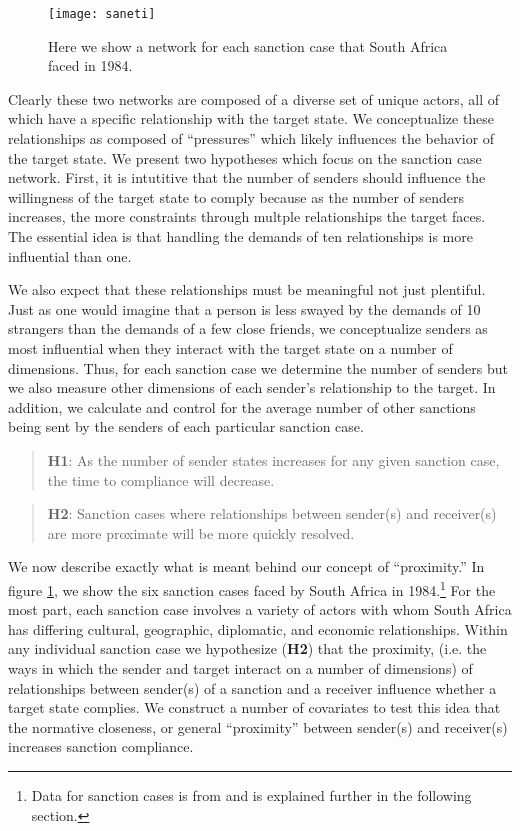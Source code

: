 \begin{figure}[ht]
	\centering
	\texttt{[image: saneti]}
	\caption{Here we show a network for each sanction case that South Africa faced in 1984.}
	\label{fig:saneti}
\end{figure}
\FloatBarrier

Clearly these two networks are composed of a diverse set of unique actors, all of which have a specific relationship with the target state. We conceptualize these relationships as composed of ``pressures'' which likely influences the behavior of the target state. We present two hypotheses which focus on the sanction case network. First, it is intutitive that the number of senders should influence the willingness of the target state to comply because as the number of senders increases, the more constraints through multple relationships the target faces. The essential idea is that handling the demands of ten relationships is more influential than one. 

We also expect that these relationships must be meaningful not just plentiful. Just as one would imagine that a person is less swayed by the demands of 10 strangers than the demands of a few close friends, we conceptualize senders as most influential when they interact with the target state on a number of dimensions.  Thus, for each sanction case we determine the number of senders but we also measure other dimensions of each sender's relationship to the target. In addition, we calculate and control for the average number of other sanctions being sent by the senders of each particular sanction case.

\begin{quote}
	\textbf{H1}: As the number of sender states increases for any given sanction case, the time to compliance will decrease. 
\end{quote}

\begin{quote}
	\textbf{H2}: Sanction cases where relationships between sender(s) and receiver(s) are more proximate will be more quickly resolved.
\end{quote}

 We now describe exactly what is meant behind our concept of ``proximity.'' In figure \ref{fig:saneti}, we show the six sanction cases faced by South Africa in 1984.\footnote{Data for sanction cases is from \citet{morgan2009threat} and is explained further in the following section.} For the most part, each sanction case involves a variety of actors with whom South Africa has differing cultural, geographic, diplomatic, and economic relationships. Within any individual sanction case we hypothesize (\textbf{H2}) that the proximity, (i.e. the ways in which the sender and target interact on a number of dimensions) of relationships between sender(s) of a sanction and a receiver influence whether a target state complies. We construct a number of covariates to test this idea that the normative closeness, or general ``proximity'' between sender(s) and receiver(s) increases sanction compliance. 

